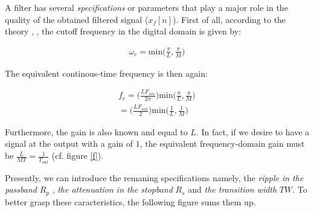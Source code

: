  A filter has several \textit{specifications} or parameters that play a major role in the quality of the obtained filtered signal ($x_f[n]$). First of all, according to the theory \cite{Proakis}, \cite{Oppenheim}, the cutoff frequency in the digital domain is given by: 
	
\begin{align}
	\omega_c = \text{min}\Big(\frac{\pi}{L},\frac{\pi}{M}\Big) \label{eqn:cutoff_digital}
\end{align}

The equivalent continous-time frequency is then again:

\begin{align}
f_c = \Big(\frac{LF_{sin}}{2\pi} \Big)\text{min}\Big(\frac{\pi}{L},\frac{\pi}{M}\Big) \nonumber \\ 
= \Big(\frac{LF_{sin}}{2} \Big)\text{min}\Big(\frac{1}{L},\frac{1}{M} \Big) \label{eqn:cutoff_continuous}
\end{align}

Furthermore, the gain is also known and equal to $L$. In fact, if we desire to have a signal at the output with a gain of $1$, the equivalent frequency-domain gain must be $\frac{L}{MT} = \frac{1}{T_{out}}$ (cf. figure \ref{f}). 

Presently, we can introduce the remaning specifications namely, the \textit{ripple in the passband} $R_p$ , \textit{the attenuation in the stopband} $R_s$ and \textit{the transition width} $TW$. To better grasp these caracteristics, the following figure sums them up. 


